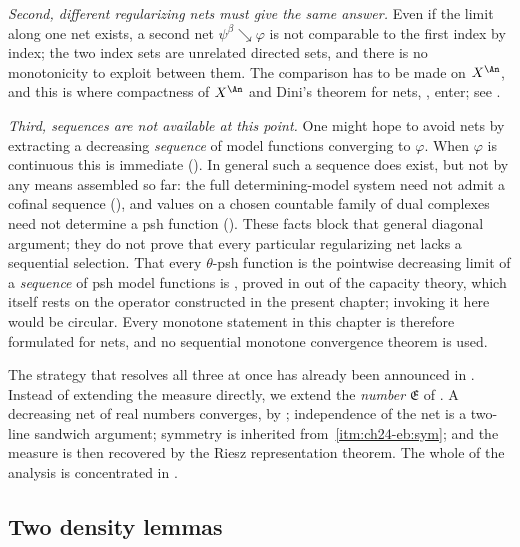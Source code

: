 \emph{Second, different regularizing nets must give the same answer.}  Even
if the limit along one net exists, a second net $\psi^\beta\searrow\varphi$
is not comparable to the first index by index; the two index sets are
unrelated directed sets, and there is no monotonicity to exploit between
them.  The comparison has to be made on $X^{\An}$, and this is where
compactness of $X^{\An}$ and Dini's theorem for nets,
, enter; see .

\emph{Third, sequences are not available at this point.}  One might hope to
avoid nets by extracting a decreasing \emph{sequence} of model functions
converging to $\varphi$.  When $\varphi$ is continuous this is
immediate ().  In general
such a sequence does exist, but not by any means assembled so far: the
full determining-model system need not admit a cofinal sequence
(), and values on a chosen countable
family of dual complexes need not determine a psh function
().  These facts block that general
diagonal argument; they do not prove that every particular regularizing
net lacks a sequential selection.  That every $\theta$-psh function is the
pointwise decreasing limit of a \emph{sequence} of psh model functions is
, proved in
 out of the capacity theory, which itself rests on
the operator constructed in the present chapter; invoking it here would be
circular.  Every monotone statement in this chapter is therefore formulated
for nets, and no sequential monotone convergence theorem is used.

The strategy that resolves all three at once has already been announced in
.  Instead of extending the measure directly, we extend
the \emph{number} $\mathfrak E$ of .  A
decreasing net of real numbers converges, by
; independence of the net is a two-line
sandwich argument; symmetry is inherited from
\,\cref{itm:ch24-eb:sym}; and the measure is then
recovered by the Riesz representation theorem.  The whole of the analysis is
concentrated in .

\subsection{Two density lemmas}
\label{sec:ch24-density}

